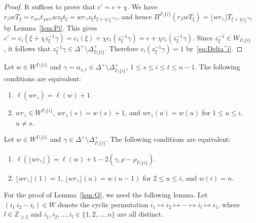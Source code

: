 \documentclass[ALCO,ThmDefs,Unicode,epreuves]{cedram}
\newcommand{\BZ}{\mathbb{Z}}
\begin{document}
\begin{proof}
It suffices to prove that 
$c' = c + \chi$. 
We have 
$r_{\beta} w T_{\xi} 
= r_{w\gamma} t_{\chi w\gamma} w z_{\xi} t_{\xi}
= w r_{\gamma} z_{\xi} t_{\xi + \chi z_{\xi}^{-1} \gamma}$, 
and hence 
$\Pi^{I \setminus \{ i \}}(r_{\beta} w T_{\xi}) 
= \lfloor wr_{\gamma} \rfloor T_{\xi + \chi z_{\xi}^{-1} \gamma}$
by Lemma~\ref{lem:Pi}. 
This gives 
$c' = c_i(\xi + \chi z_{\xi}^{-1} \gamma)
= c_i(\xi) + \chi c_i(z_{\xi}^{-1} \gamma) 
= c + \chi c_i(z_{\xi}^{-1} \gamma)$. 
Since 
$z_{\xi}^{-1} \in W_{I \setminus \{ i \}}$, 
it follows that 
$z_{\xi}^{-1} \gamma \in \Delta^+ \setminus \Delta_{I \setminus \{ i \}}^+$. 
Therefore 
$c_i(z_{\xi}^{-1} \gamma) = 1$
by~\eqref{eq:Delta^i}.
\end{proof}

\begin{lemm}[{\cite[Proposition~2.4.8]{BB}}]
\label{lem:B}
Let 
$w \in W^{I \setminus \{ i \}}$ 
and 
$\gamma = \alpha_{s,t} \in \Delta^+ \setminus \Delta_{I \setminus \{ i \}}^+$, 
$1 \leq s \leq i \leq t \leq n-1$. 
The following conditions are equivalent:
\begin{enumerate}[label=(\arabic*)]
\item\label{Lemm_4.14_1}
$\ell(w r_{\gamma}) = \ell(w) + 1$.
\item\label{Lemm_4.14_2}
$w r_{\gamma} \in W^{I \setminus \{ i \}}$, 
$w r_{\gamma}(s) = w(s) + 1$, 
and 
$w r_{\gamma}(u) = w(u)$ 
for $1 \leq u \leq i$, $u \neq s$.
\end{enumerate}
\end{lemm}

\begin{lemm} \label{lem:Q}
Let 
$w \in W^{I \setminus \{ i \}}$
and 
$\gamma \in \Delta^+ \setminus \Delta_{I \setminus \{ i \}}^+$. 
The following conditions are equivalent:
\begin{enumerate}[label=(\arabic*),series=lemma4.15]
\item\label{lemma4.15_1}
$\ell(\lfloor w r_{\gamma} \rfloor) = \ell(w) + 1 - 2(\gamma,\rho-\rho_{I \setminus \{ i \}})$.
\item\label{lemma4.15_2}
$\lfloor w r_{\gamma} \rfloor (1) = 1$, 
$\lfloor w r_{\gamma} \rfloor (u) = w(u-1)$ for $2 \leq u \leq i$, 
and 
$w(i) = n$.
\end{enumerate}
\end{lemm}

For the proof of Lemma~\ref{lem:Q}, 
we need the following lemma.
Let 
$(i_1 \ i_2 \ \cdots \ i_{l}) \in W$ 
denote the cyclic permutation 
$i_1 \mapsto i_2 \mapsto \cdots \mapsto i_{l} \mapsto i_1$, 
where 
$l \in \BZ_{\geq 2}$ 
and 
$i_1 , i_2 , \ldots , i_{l} \in \{ 1,2,\ldots ,n \}$
are all distinct. 
\end{document}
